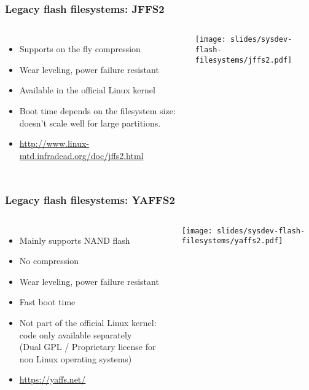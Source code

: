 \begin{frame}
  \frametitle{Legacy flash filesystems: JFFS2}
  \begin{columns}
    \begin{itemize}
    \item Supports on the fly compression
    \item Wear leveling, power failure resistant
    \item Available in the official Linux kernel
    \item Boot time depends on the filesystem size: doesn't scale well
      for large partitions.
    \item \url{http://www.linux-mtd.infradead.org/doc/jffs2.html}
    \end{itemize}
    \texttt{[image: slides/sysdev-flash-filesystems/jffs2.pdf]}
  \end{columns}
\end{frame}

\begin{frame}
  \frametitle{Legacy flash filesystems: YAFFS2}
  \begin{columns}
    \begin{itemize}
    \item Mainly supports NAND flash
    \item No compression
    \item Wear leveling, power failure resistant
    \item Fast boot time
    \item Not part of the official Linux kernel: code only available
      separately\\
      (Dual GPL / Proprietary license for non Linux operating systems)
    \item \url{https://yaffs.net/}
    \end{itemize}
    \texttt{[image: slides/sysdev-flash-filesystems/yaffs2.pdf]}
  \end{columns}
\end{frame}



